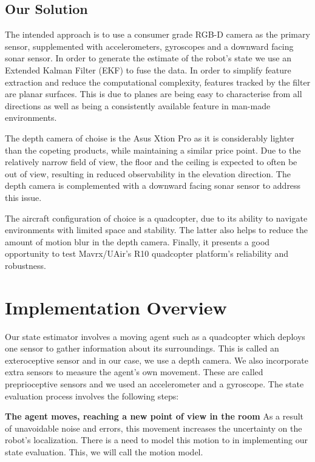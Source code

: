 \documentclass[]{article}
\begin{document}
{\subsection{Our Solution} %
\label{sub:our_solution}

The intended approach is to use a consumer grade RGB-D camera as the primary sensor, supplemented with accelerometers, gyroscopes and a downward facing sonar sensor. In order to generate the estimate of the robot's state we use an Extended Kalman Filter (EKF) to fuse the data. In order to simplify feature extraction and reduce the computational complexity, features tracked by the filter are planar surfaces. This is due to planes are being easy to characterise from all directions as well as being a consistently available feature in man-made environments. 

The depth camera of choise is the Asus Xtion Pro as it is considerably lighter than the copeting products, while maintaining a similar price point. Due to the relatively narrow field of view, the floor and the ceiling is expected to often be out of view, resulting in reduced observability in the elevation direction. The depth camera is complemented with a downward facing sonar sensor to address this issue.

The aircraft configuration of choice is a quadcopter, due to its ability to navigate environments with limited space and stability. The latter also helps to reduce the amount of motion blur in the depth camera. Finally, it presents a good opportunity to test Mavrx/UAir's R10 quadcopter platform's reliability and robustness.

\section{Implementation Overview}
\label{sub:implementation_overview}
Our state estimator involves a moving agent such as a quadcopter which deploys one sensor to gather information about its surroundings. This is called an exteroceptive sensor and in our case, we use a depth camera. We also incorporate extra sensors to measure the agent's own movement. These are called preprioceptive sensors and we used an accelerometer and a gyroscope. The state evaluation process involves the following steps:

\textbf{The agent moves, reaching a new point of view in the room} As a result of unavoidable noise
and errors, this movement increases the uncertainty on the robot's localization.
There is a need to model this motion to in implementing our state evaluation. This, we will call the motion model.

}
\end{document}
